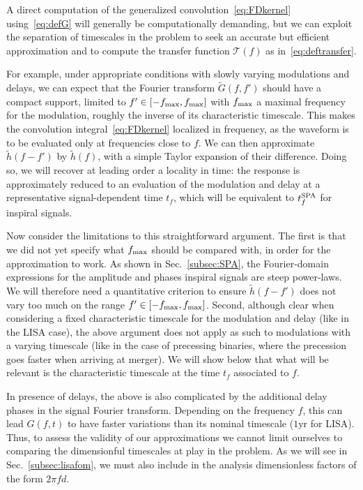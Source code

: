 \documentclass[aps,showpacs,twocolumn,
prd,superscriptaddress,nofootinbib]{revtex4-1}
\newcommand\calT{{\mathcal{T}}}
\newcommand{\tf}{t_{f}}
\newcommand{\tfSPA}{t_{f}^{\rm SPA}}
\begin{document}
A direct computation of the generalized convolution~\eqref{eq:FDkernel} using~\eqref{eq:defG} will generally be computationally demanding, but we can exploit the separation of timescales in the problem to seek an accurate but efficient approximation and to compute the transfer function $\calT(f)$ as in~\eqref{eq:deftransfer}.

For example, under appropriate conditions with slowly varying modulations and delays, we can expect that the Fourier transform $\tilde{G}(f,f')$ should have a compact support, limited to $f' \in [-f_{\rm max}, f_{\rm max}]$ with $f_{\rm max}$ a maximal frequency for the modulation, roughly the inverse of its characteristic timescale. This makes the convolution integral~\eqref{eq:FDkernel} localized in frequency, as the waveform is to be evaluated only at frequencies close to $f$. We can then approximate $\tilde{h}(f-f')$ by $\tilde{h}(f)$, with a simple Taylor expansion of their difference. Doing so, we will recover at leading order a locality in time: the response is approximately reduced to an evaluation of the modulation and delay at a representative signal-dependent time $\tf$, which will be equivalent to $\tfSPA$ for inspiral signals.

Now consider the limitations to this straightforward argument. The first is that we did not yet specify what $f_{\rm max}$ should be compared with, in order for the approximation to work. As shown in Sec.~\ref{subsec:SPA}, the Fourier-domain expressions for the amplitude and phases inspiral signals are steep power-laws. We will therefore need a quantitative criterion to ensure $\tilde{h}(f-f')$ does not vary too much on the range $f'\in [-f_{\rm max}, f_{\rm max}]$. Second, although clear when considering a fixed characteristic timescale for the modulation and delay (like in the LISA case), the above argument does not apply as such to modulations with a varying timescale (like in the case of precessing binaries, where the precession goes faster when arriving at merger). We will show below that what will be relevant is the characteristic timescale at the time $t_{f}$ associated to $f$. 

In presence of delays, the above is also complicated by the additional delay phases in the signal Fourier transform. Depending on the frequency $f$, this can lead $G(f,t)$ to have faster variations than its nominal timescale ($1\mathrm{yr}$ for LISA). Thus, to assess the validity of our approximations we cannot limit ourselves to comparing the dimensionful timescales at play in the problem. As we will see in Sec.~\ref{subsec:lisafom}, we must also include in the analysis dimensionless factors of the form $2\pi f d$.
\end{document}
